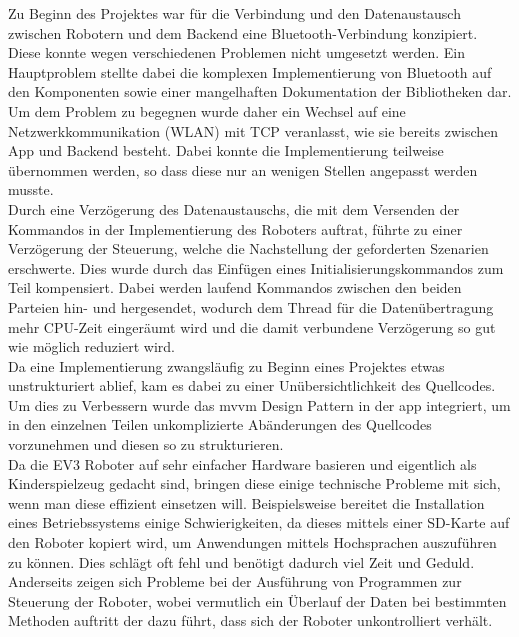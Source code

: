 \noindent
 Zu Beginn des Projektes war für die Verbindung und den Datenaustausch zwischen Robotern und dem Backend eine Bluetooth-Verbindung konzipiert. Diese konnte wegen verschiedenen Problemen nicht umgesetzt werden. Ein Hauptproblem stellte dabei die komplexen Implementierung von Bluetooth auf den Komponenten sowie einer mangelhaften Dokumentation der Bibliotheken dar. \\
 Um dem Problem zu begegnen wurde daher ein Wechsel auf eine Netzwerkkommunikation (WLAN) mit TCP veranlasst, wie sie bereits zwischen App und Backend besteht. Dabei konnte die Implementierung teilweise übernommen werden, so dass diese nur an wenigen Stellen angepasst werden musste.\\

\noindent
Durch eine Verzögerung des Datenaustauschs, die mit dem Versenden der Kommandos in der Implementierung des Roboters auftrat, führte zu einer Verzögerung der Steuerung, welche die Nachstellung der geforderten Szenarien erschwerte. Dies wurde durch das Einfügen eines Initialisierungskommandos zum Teil kompensiert. Dabei werden laufend Kommandos zwischen den beiden Parteien hin- und hergesendet, wodurch dem Thread für die Datenübertragung mehr CPU-Zeit eingeräumt wird und die damit verbundene Verzögerung so gut wie möglich reduziert wird.\\

\noindent
Da eine Implementierung zwangsläufig zu Beginn eines Projektes etwas unstrukturiert ablief, kam es dabei zu einer Unübersichtlichkeit des Quellcodes. Um dies zu Verbessern wurde das \gls{mvvm} Design Pattern in der \gls{app} integriert, um in den einzelnen Teilen unkomplizierte Abänderungen des Quellcodes vorzunehmen und diesen so zu strukturieren.\\

\noindent
Da die EV3 Roboter auf sehr einfacher Hardware basieren und eigentlich als Kinderspielzeug gedacht sind, bringen diese einige technische Probleme mit sich, wenn man diese effizient einsetzen will. Beispielsweise bereitet die Installation eines Betriebssystems einige Schwierigkeiten, da dieses mittels einer SD-Karte auf den Roboter kopiert wird, um Anwendungen mittels Hochsprachen auszuführen zu können. Dies schlägt oft fehl und benötigt dadurch viel Zeit und Geduld. \\
Anderseits zeigen sich Probleme bei der Ausführung von Programmen zur Steuerung der Roboter, wobei vermutlich ein Überlauf der Daten bei bestimmten Methoden auftritt der dazu führt, dass sich der Roboter unkontrolliert verhält.\\